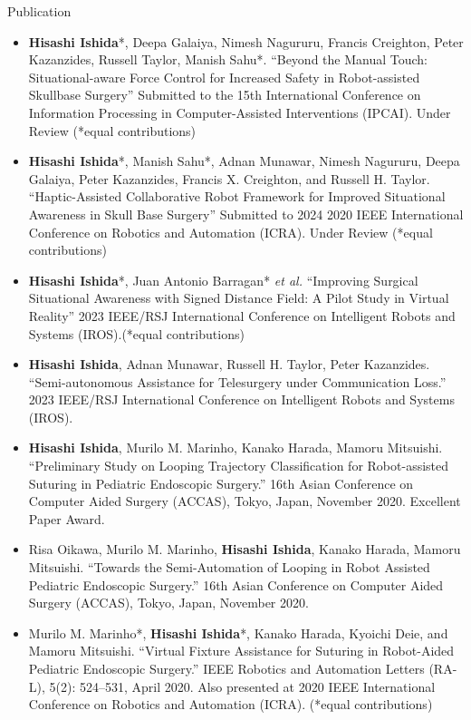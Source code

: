\documentclass{resume} %
\begin{document}
\begin{rSection}{Publication} 
\begin{itemize}
\item \textbf{Hisashi Ishida}*, Deepa Galaiya, Nimesh Nagururu,
Francis Creighton, Peter Kazanzides, Russell Taylor,
Manish Sahu*. “Beyond the Manual Touch: Situational-aware Force Control for Increased Safety in Robot-assisted Skullbase Surgery” Submitted to the 15th International Conference on Information Processing in
Computer-Assisted Interventions (IPCAI). Under Review (*equal contributions)


\item \textbf{Hisashi Ishida}*, Manish Sahu*, Adnan Munawar, Nimesh Nagururu, Deepa Galaiya, Peter Kazanzides, Francis X. Creighton, and Russell H. Taylor. “Haptic-Assisted Collaborative Robot Framework for Improved Situational Awareness in Skull Base Surgery” Submitted to 2024 2020 IEEE International Conference on Robotics and Automation (ICRA). Under Review (*equal contributions)

\item \textbf{Hisashi Ishida}*, Juan Antonio Barragan* \textit{et al.} “Improving Surgical Situational Awareness with Signed Distance Field: A Pilot Study in Virtual Reality” 2023 IEEE/RSJ International Conference on Intelligent Robots and Systems (IROS).(*equal contributions)

\item \textbf{Hisashi Ishida}, Adnan Munawar, Russell H. Taylor, Peter Kazanzides. “Semi-autonomous Assistance for Telesurgery under Communication Loss.” 2023 IEEE/RSJ International Conference on Intelligent Robots and Systems (IROS). 

\item \textbf{Hisashi Ishida}, Murilo M. Marinho, Kanako Harada, Mamoru Mitsuishi. “Preliminary Study on Looping Trajectory Classification for Robot-assisted Suturing in Pediatric Endoscopic Surgery.” 16th Asian Conference on Computer Aided Surgery (ACCAS), Tokyo, Japan, November 2020. Excellent Paper Award.

\item Risa Oikawa, Murilo M. Marinho, \textbf{Hisashi Ishida}, Kanako Harada, Mamoru Mitsuishi. “Towards the Semi-Automation of Looping in Robot Assisted Pediatric Endoscopic Surgery.” 16th Asian Conference on Computer Aided Surgery (ACCAS), Tokyo, Japan, November 2020.

\item Murilo M. Marinho*, \textbf{Hisashi Ishida}*, Kanako Harada, Kyoichi Deie, and Mamoru Mitsuishi. “Virtual Fixture Assistance for Suturing in Robot-Aided Pediatric Endoscopic Surgery.” IEEE Robotics and Automation Letters (RA-L), 5(2): 524–531, April 2020. Also presented at 2020 IEEE International Conference on Robotics and Automation (ICRA). (*equal contributions)


\end{itemize}
\end{rSection}
\end{document}
